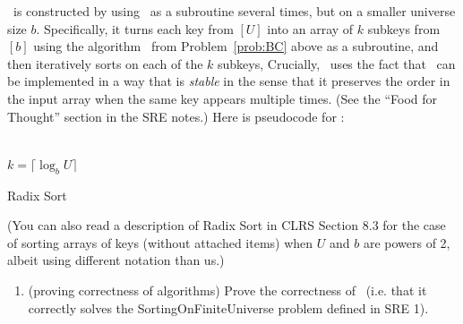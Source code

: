 \documentclass[11pt]{article}
\begin{document}
\begin{enumerate}
\RadixSort\ is constructed by using \SingletonBucketSort\ as a subroutine several times, but on a smaller universe size $b$.  Specifically, it turns each key from $[U]$ into an array of $k$ subkeys from $[b]$ using the algorithm \BC\ from Problem~\ref{prob:BC} above as a subroutine, and then iteratively sorts on each of the $k$ subkeys,
Crucially, \RadixSort\ uses the fact that \SingletonBucketSort\ can be implemented in a way that is {\em stable} in the sense that it preserves the order in the input array when the same key appears multiple times.  (See the ``Food for Thought'' section in the SRE notes.)  Here is pseudocode for \RadixSort:


\begin{algorithm}[H]
\\
$k=\lceil \log_b U\rceil$\;
\caption{Radix Sort}
\end{algorithm}

(You can also read a description of Radix Sort in CLRS Section 8.3 for the case of sorting arrays of keys (without attached items) when $U$ and $b$ are powers of 2, albeit using different notation than us.)

        \begin{enumerate}
        
            \item (proving correctness of algorithms) Prove the correctness of \RadixSort\ (i.e. that it correctly solves the SortingOnFiniteUniverse problem defined in SRE 1). 
            

\end{enumerate}
\end{enumerate}
\end{document}
